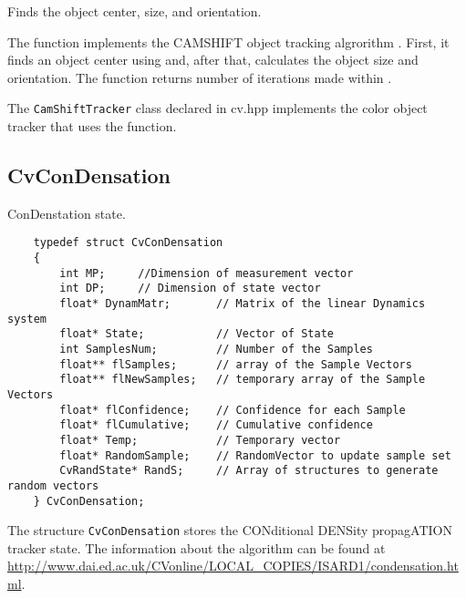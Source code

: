 Finds the object center, size, and orientation.


\begin{description}
\ifC %
\else %
\fi %
\end{description}

The function implements the CAMSHIFT object tracking algrorithm
\cite{Bradski98}.
First, it finds an object center using  and, after that, calculates the object size and orientation. The function returns number of iterations made within .

The \texttt{CamShiftTracker} class declared in cv.hpp implements the color object tracker that uses the function.

\ifC %
\subsection{CvConDensation}
ConDenstation state.

\begin{lstlisting}
    typedef struct CvConDensation
    {
        int MP;     //Dimension of measurement vector
        int DP;     // Dimension of state vector
        float* DynamMatr;       // Matrix of the linear Dynamics system
        float* State;           // Vector of State
        int SamplesNum;         // Number of the Samples
        float** flSamples;      // array of the Sample Vectors
        float** flNewSamples;   // temporary array of the Sample Vectors
        float* flConfidence;    // Confidence for each Sample
        float* flCumulative;    // Cumulative confidence
        float* Temp;            // Temporary vector
        float* RandomSample;    // RandomVector to update sample set
        CvRandState* RandS;     // Array of structures to generate random vectors
    } CvConDensation;

\end{lstlisting}
The structure \texttt{CvConDensation} stores the CONditional DENSity propagATION tracker state. The information about the algorithm can be found at \url{http://www.dai.ed.ac.uk/CVonline/LOCAL\_COPIES/ISARD1/condensation.html}.

